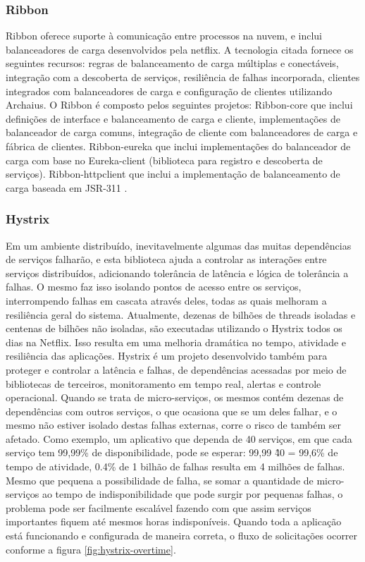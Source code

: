 \documentclass[journal]{IEEEtran}
\begin{document}
\subsubsection{Ribbon}
Ribbon oferece suporte à comunicação entre processos na nuvem, e inclui balanceadores de carga desenvolvidos pela netflix. A tecnologia citada fornece os seguintes recursos: regras de balanceamento de carga múltiplas e conectáveis, integração com a descoberta de serviços, resiliência de falhas incorporada, clientes integrados com balanceadores de carga e configuração de clientes utilizando Archaius. O Ribbon é composto pelos seguintes projetos: Ribbon-core que inclui definições de interface e balanceamento de carga e cliente, implementações de balanceador de carga comuns, integração de cliente com balanceadores de carga e fábrica de clientes. Ribbon-eureka que inclui implementações do balanceador de carga com base no Eureka-client (biblioteca para registro e descoberta de serviços). Ribbon-httpclient que inclui a implementação de balanceamento de carga baseada em JSR-311 \cite{netflix2016Ribbon}.

\subsubsection{Hystrix}
Em um ambiente distribuído, inevitavelmente algumas das muitas dependências de serviços falharão, e esta biblioteca ajuda a controlar as interações entre serviços distribuídos, adicionando tolerância de latência e lógica de tolerância a falhas. O mesmo faz isso isolando pontos de acesso entre os serviços, interrompendo falhas em cascata através deles, todas as quais melhoram a resiliência geral do sistema. Atualmente, dezenas de bilhões de threads isoladas e centenas de bilhões não isoladas, são executadas utilizando o Hystrix todos os dias na Netflix. Isso resulta em uma melhoria dramática no tempo, atividade e resiliência das aplicações. Hystrix é um projeto desenvolvido também para proteger e controlar a latência e falhas, de dependências acessadas por meio de bibliotecas de terceiros, monitoramento em tempo real, alertas e controle operacional. Quando se trata de micro-serviços, os mesmos contém dezenas de dependências com outros serviços, o que ocasiona que se um deles falhar, e o mesmo não estiver isolado destas falhas externas, corre o risco de também ser afetado. Como exemplo, um aplicativo que dependa de 40 serviços, em que cada serviço tem 99,99\% de disponibilidade, pode se esperar: 99,99 \^ 40 = 99,6\% de tempo de atividade, 0.4\% de 1 bilhão de falhas resulta em 4 milhões de falhas. Mesmo que pequena a possibilidade de falha, se somar a quantidade de micro-serviços ao tempo de indisponibilidade que pode surgir por pequenas falhas, o problema pode ser facilmente escalável fazendo com que assim serviços importantes fiquem até mesmos horas indisponíveis. Quando toda a aplicação está funcionando e configurada de maneira correta, o fluxo de solicitações ocorrer conforme a figura \ref{fig:hystrix-overtime}.
\end{document}
